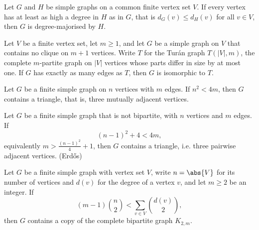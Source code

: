 \begin{theorem}
\label{SimpleGraph.degreeMajorised_of_forall_degree_le}
Let $G$ and $H$ be simple graphs on a common finite vertex set $V$. If every vertex has
at least as high a degree in $H$ as in $G$, that is $d_G(v) \le d_H(v)$ for all $v \in
V$, then $G$ is degree-majorised by $H$.
\end{theorem}

\begin{theorem}
\label{SimpleGraph.turan_iso_of_card_edgeFinset_eq}
Let $V$ be a finite vertex set, let $m \geq 1$, and let $G$ be a simple graph on $V$
that contains no clique on $m+1$ vertices. Write $T$ for the Turán graph $T(|V|, m)$,
the complete $m$-partite graph on $|V|$ vertices whose parts differ in size by at most
one. If $G$ has exactly as many edges as $T$, then $G$ is isomorphic to $T$.
\end{theorem}

\begin{theorem}
\label{SimpleGraph.triangle_of_card_edgeFinset_gt}
Let $G$ be a finite simple graph on $n$ vertices with $m$ edges. If $n^2 < 4m$, then $G$
contains a triangle, that is, three mutually adjacent vertices.
\end{theorem}

\begin{theorem}
\label{SimpleGraph.triangle_of_not_bipartite_of_card_edgeFinset_gt}
Let $G$ be a finite simple graph that is not bipartite, with $n$ vertices and $m$ edges.
If \[(n-1)^2 + 4 < 4m,\] equivalently $m > \tfrac{(n-1)^2}{4} + 1$, then $G$ contains a
triangle, i.e. three pairwise adjacent vertices. (Erdős)
\end{theorem}

\begin{theorem}
\label{SimpleGraph.isContained_completeBipartite_two_of_sum_choose_gt}
Let $G$ be a finite simple graph with vertex set $V$, write $n = \abs{V}$ for its number
of vertices and $d(v)$ for the degree of a vertex $v$, and let $m \ge 2$ be an integer.
If
\[ (m-1)\binom{n}{2} < \sum_{v \in V} \binom{d(v)}{2}, \]
then $G$ contains a copy of the complete bipartite graph $K_{2,m}$.
\end{theorem}

